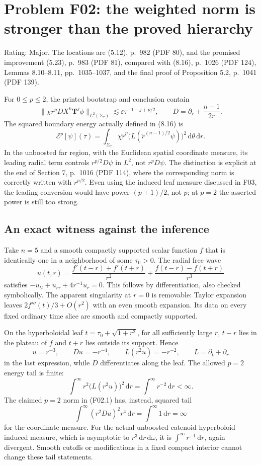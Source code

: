 \documentclass[10pt]{article}
\begin{document}
\section*{Problem F02: the weighted norm is stronger than the proved hierarchy}
Rating: Major. The locations are (5.12), p. 982 (PDF 80), and the promised improvement (5.23), p. 983 (PDF 81), compared with (8.16), p. 1026 (PDF 124), Lemmas 8.10–8.11, pp. 1035–1037, and the final proof of Proposition 5.2, p. 1041 (PDF 139).\par
For \(0\leq p\leq2\), the printed bootstrap and conclusion contain \[\|\chi r^p D X^k\mathbf T^j\phi\|_{L^2(\Sigma_\tau)}
\lesssim \varepsilon\tau^{-1-j+p/2},
\qquad D=\partial_r+\frac{n-1}{2r}.
\tag{F02.1}\] The squared boundary energy actually defined in (8.16) is \[\mathcal E^p[\psi](\tau)
=\int_{\Sigma_\tau}\chi\widetilde r^p
 \bigl(L(\widetilde r^{(n-1)/2}\psi)\bigr)^2\,\mathrm d\theta\,\mathrm dr .
\tag{F02.2}\] In the unboosted far region, with the Euclidean spatial coordinate measure, its leading radial term controls \(r^{p/2}D\psi\) in \(L^2\), not \(r^pD\psi\). The distinction is explicit at the end of Section 7, p. 1016 (PDF 114), where the corresponding norm is correctly written with \(r^{p/2}\). Even using the induced leaf measure discussed in F03, the leading conversion would have power \((p+1)/2\), not \(p\); at \(p=2\) the asserted power is still too strong.\par
\subsection*{An exact witness against the inference}
Take \(n=5\) and a smooth compactly supported scalar function \(f\) that is identically one in a neighborhood of some \(\tau_0>0\). The radial free wave \[u(t,r)=\frac{f'(t-r)+f'(t+r)}{r^2}
       +\frac{f(t-r)-f(t+r)}{r^3}
\tag{F02.3}\] satisfies \(-u_{tt}+u_{rr}+4r^{-1}u_r=0\). This follows by differentiation, also checked symbolically. The apparent singularity at \(r=0\) is removable: Taylor expansion leaves \(2f'''(t)/3+O(r^2)\) with an even smooth expansion. Its data on every fixed ordinary time slice are smooth and compactly supported.\par
On the hyperboloidal leaf \(t=\tau_0+\sqrt{1+r^2}\), for all sufficiently large \(r\), \(t-r\) lies in the plateau of \(f\) and \(t+r\) lies outside its support. Hence \[u=r^{-3},\qquad D u=-r^{-4},\qquad
L(r^2u)=-r^{-2},\qquad L=\partial_t+\partial_r\] in the last expression, while \(D\) differentiates along the leaf. The allowed \(p=2\) energy tail is finite: \[\int^\infty r^2\bigl(L(r^2u)\bigr)^2\,\mathrm dr
=\int^\infty r^{-2}\,\mathrm dr<\infty .\] The claimed \(p=2\) norm in (F02.1) has, instead, squared tail \[\int^\infty (r^2Du)^2r^4\,\mathrm dr=\int^\infty1\,\mathrm dr=\infty\] for the coordinate measure. For the actual unboosted catenoid-hyperboloid induced measure, which is asymptotic to \(r^3\,\mathrm dr\,\mathrm d\omega\), it is \(\int^\infty r^{-1}\,\mathrm dr\), again divergent. Smooth cutoffs or modifications in a fixed compact interior cannot change these tail statements.\par
\end{document}
